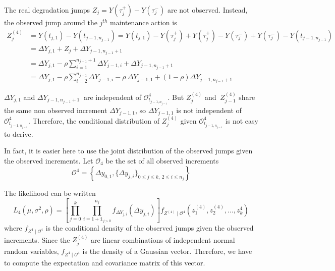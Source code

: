 \noindent The real degradation jumps $Z_j = Y(\tau_{j}^+) - Y(\tau_{j}^-)$ are not observed.
Instead, the observed jump around the $j^{th}$ maintenance action is 
\begin{align}
Z_j^{(4)}&= Y(t_{j,1})-Y(t_{j-1,n_{j-1}})
=Y(t_{j,1})-Y(\tau_j^+)+Y(\tau_j^+)-Y(\tau_j^-)+Y(\tau_j^-)-Y(t_{j-1,n_{j-1}}) \nonumber\\
&=\Delta Y_{j,1}+Z_j +\Delta Y_{j-1,n_{j-1}+1} \nonumber\\
&=\Delta Y_{j,1}-\rho \sum\limits_{i=1}^{n_{j-1}+1} \Delta Y_{j-1,i}+\Delta Y_{j-1,n_{j-1}+1}\nonumber\\
&=\Delta Y_{j,1}-\rho \sum\limits_{i=2}^{n_{j-1}} \Delta Y_{j-1,i}-\rho\ \Delta Y_{j-1,1}+(1-\rho)\Delta Y_{j-1,n_{j-1}+1}
\label{eq:zj4}
\end{align}

\noindent $\Delta Y_{j,1}$ and $\Delta Y_{j-1,n_{j-1}+1}\ $ are independent of $\mathcal{O}_{t_{j-1,n_{j-1}}}^4$. But $Z_j^{(4)}$ and $\ Z_{j-1}^{(4)}$ share the same non observed increment $\Delta Y_{j-1,1}$, so $\Delta Y_{j-1,1}$ is not independent of $\mathcal{O}_{t_{j-1,n_{j-1}}}^4$. Therefore, the conditional distribution of $Z_j^{(4)}$ given $\mathcal{O}_{t_{j-1,n_{j-1}}}^4$ is not easy to derive.

\noindent In fact, it is easier here to use the joint distribution of the observed jumps given the observed increments. Let $\mathcal{O}_4$ be the set of all observed increments
$$\mathcal{O}^4=\left\{\Delta y_{0,1},\{\Delta y_{j,i}\}_{ 0 \leq j \leq k,\ 2 \leq i \leq n_j }\right\}$$

\noindent The likelihood can be written
\begin{equation}
L_4\left(\mu,\sigma^2,\rho \right)
=\left[\prod \limits_{j=0}^{k}\prod\limits_{i=1+\mathds{1}_{j>0}}^{n_j}f_{\Delta Y_{j,i}}\left(\Delta y_{j,i}\right) \right]  f_{Z^{(4)} \mid \mathcal{O}^4}\left(z_{1}^{(4)},z_{2}^{(4)},...,z_k^4\right) 
\label{eq:like_scheme4}
\end{equation}
\noindent where $f_{Z^4 \mid \mathcal{O}^4}$ is the conditional density of the observed jumps given the observed increments. Since the $Z_j^{(4)}$ are linear combinations of independent normal random variables, $f_{Z^4 \mid \mathcal{O}^4}$ is the density of a Gaussian vector. Therefore, we have to compute the expectation and covariance matrix of this vector.


